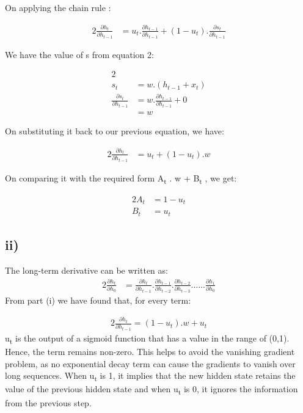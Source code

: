 On applying the chain rule : 

\begin{alignat}{2}
\frac {\partial h_t}{\partial h_{t-1}} &= u_t . \frac {\partial h_{t-1}}{\partial h_{t-1}} + (1-u_t).\frac {\partial s_t}{\partial h_{t-1}}
\end{alignat}

We have the value of s from equation 2:

\begin{alignat}{2}
\\s_t &= w. (h_{t-1} + x_t)
\\ \frac {\partial s_t}{\partial h_{t-1}} &= w.\frac{\partial h_{t-1}}{\partial h_{t-1}} + 0 
\\ &= w
\end{alignat}

On substituting it back to our previous equation, we have:

\begin{alignat}{2}
\frac {\partial h_t}{\partial h_{t-1}} &= u_t + (1-u_t).w
\end{alignat}

On comparing it with the required form A\textsubscript{t} . w + B\textsubscript{t} , we get:

\begin{alignat}{2}
    A_t &= 1-u_t
\\ B_t &= u_t
\end{alignat}

\subsection*{ii)}
The long-term derivative can be written as:
\begin{alignat}{2}
\frac {\partial h_t}{\partial h_0} &= \frac {\partial h_t}{\partial h_{t-1}} . \frac {\partial h_{t-1}}{\partial h_{t-2}}. \frac {\partial h_{t-2}}{\partial h_{t-3}}...... \frac {\partial h_1}{\partial h_0} 
\end{alignat}
From part (i) we have found that, for every term:

\begin{alignat}{2}
\frac {\partial h_t}{\partial h_{t-1}} = (1-u_t) .w + u_t
\end{alignat}
u\textsubscript{t} is the output of a sigmoid function that has a value in the range of (0,1). Hence, the term remains non-zero. This helps to avoid the vanishing gradient problem, as no exponential decay term can cause the gradients to vanish over long sequences.
When u\textsubscript{t} is 1, it implies that the new hidden state retains the value of the previous hidden state and when u\textsubscript{t} is 0, it ignores the information from the previous step. 



